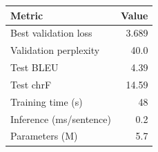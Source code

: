 \begin{tabular}{lr}
\toprule
Metric & Value \\
\midrule
Best validation loss & 3.689 \\
Validation perplexity & 40.0 \\
Test BLEU & 4.39 \\
Test chrF & 14.59 \\
Training time (s) & 48 \\
Inference (ms/sentence) & 0.2 \\
Parameters (M) & 5.7 \\
\bottomrule
\end{tabular}
